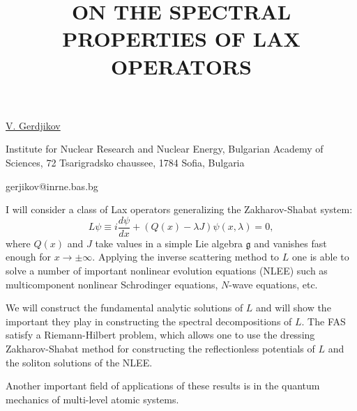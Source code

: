 \title{ON THE SPECTRAL PROPERTIES OF LAX OPERATORS}

\underline{V. Gerdjikov} 

{\normalsize{\vspace{-4mm}
Institute for Nuclear Research and Nuclear Energy, Bulgarian Academy
of Sciences, 72 Tsarigradsko chaussee, 1784 Sofia, Bulgaria

\email gerjikov@inrne.bas.bg}}

I  will consider a class of Lax operators generalizing the
Zakharov-Shabat system:
\begin{equation}\label{eq:L}
L\psi \equiv i\frac{d\psi}{dx} + (Q(x) - \lambda J)\psi(x,\lambda)=0,
\end{equation}
where $Q(x)$ and $J$ take values in a simple Lie algebra $\mathfrak{g}$
and vanishes fast enough for $x\to\pm\infty$.
Applying the inverse scattering method to $L$ one is able to solve a
number of important nonlinear evolution equations (NLEE) such as multicomponent
nonlinear Schrodinger equations, $N$-wave equations, etc.

We will construct the fundamental analytic solutions of $L$ and will show
the important they play in constructing the spectral decompositions of $L$.
The FAS satisfy a Riemann-Hilbert problem, which allows one
 to use the dressing Zakharov-Shabat method for constructing the
reflectionless potentials of $L$ and the soliton solutions of the NLEE.

Another important field of applications of these results is in the quantum mechanics
of multi-level atomic systems.

\vspace{\baselineskip} 